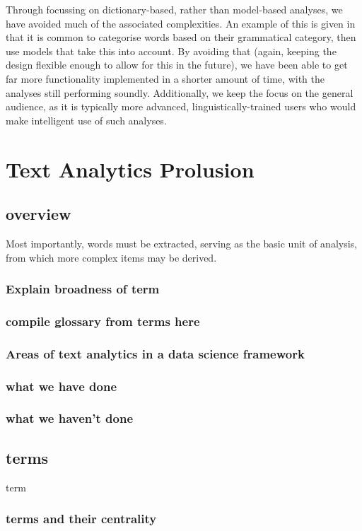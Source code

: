 \documentclass[11pt, a4paper, oneside]{report}
\begin{document}
Through focussing on dictionary-based, rather than model-based
analyses, we have avoided much of the associated complexities. An example of this is given in that it is common to categorise words based on their grammatical category, then use models that take this into account. By avoiding that (again, keeping the design flexible enough to allow for this in the future), we have been able to get far more functionality implemented in a shorter amount of time, with the analyses still performing soundly. Additionally, we keep the focus on the general audience, as it is typically more advanced, linguistically-trained users who would make intelligent use of such analyses.

\chapter{Text Analytics Prolusion}
\label{cha:text-analyt-backgr}

\section{overview}
\label{sec:overview}
Most importantly, words must be extracted, serving as the basic unit
of analysis, from which more complex items may be derived.
\subsection{Explain broadness of term}
\subsection{compile glossary from terms here}
\subsection{Areas of text analytics in a data science framework}
\subsection{what we have done}
\subsection{what we haven't done}

\section{terms}
\label{sec:terms}
\gls{term}
\subsection{terms and their centrality}
\end{document}
